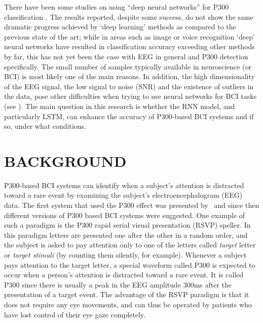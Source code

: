 \documentclass[
11pt, %
english, %
singlespacing, %
headsepline, %
]{MastersDoctoralThesis} %
\begin{document}
\begin{samepage}
	There have been some studies on using ``deep neural networks'' for P300 classification \cite{P300_CNN, RSVP_P300_geva}. The results reported, despite some success, do not show the same dramatic progress achieved by `deep learning' methods as compared to the previous state of the art; while in areas such as image or voice recognition `deep' neural networks have resulted in classification accuracy exceeding other methods by far, this has not yet been the case with EEG in general and P300 detection specifically. The small number of samples typically available in neuroscience (or BCI) is most likely one of the main reasons. In addition, the high dimensionality of the EEG signal, the low signal to noise (SNR) and the existence of outliers in the data, pose other difficulties when trying to use neural networks for BCI tasks (see \cite{lotte2007review}). The main question in this research is whether the RNN model, and particularly LSTM, can enhance the accuracy of P300-based BCI systems and if so, under what conditions.
\end{samepage}

\vspace{0.4cm}
\section{BACKGROUND}
\vspace{0.4cm}


P300-based BCI systems can identify when a subject's attention is distracted toward a rare event by examining the subject's electroencephalogram (EEG) data. The first system that used the P300 effect was presented by~\cite{FirstP300} and since then different versions of P300 based BCI systems were suggested. One example of such a paradigm is the P300 rapid serial visual presentation (RSVP) speller. In this paradigm letters are presented one after the other in a random order, and the subject is asked to pay attention only to one of the letters called \textit{target} letter or \textit{target stimuli} (by counting them silently, for example). Whenever a subject pays attention to the target letter, a special waveform called P300 is expected to occur when a person's attention is distracted toward a rare event. It is called P300 since there is usually a peak in the EEG amplitude 300ms after the presentation of a target event. The advantage of the RSVP paradigm is that it does not require any eye movements, and can thus be operated by patients who have lost control of their eye gaze completely.
\end{document}
